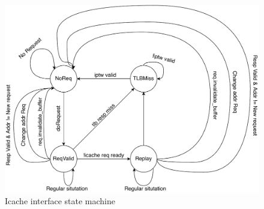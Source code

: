 \begin{figure}[H]
	\centering
	\includegraphics[width=\textwidth]{Figure/state_machine}
	\caption{Icache interface state machine}
	\label{fig:state_machine}
\end{figure}
